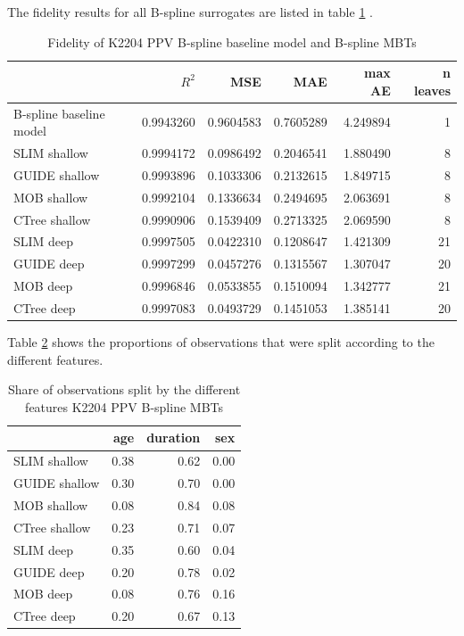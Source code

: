 The fidelity results for all B-spline surrogates are listed in table \ref{tab:ins_k2204_ppv_bsplines_surrogates_perf} .

\begin{table}

\caption{Fidelity of K2204 PPV B-spline baseline model and  B-spline MBTs}
\centering \scriptsize
\begin{tabular}[t]{l|r|r|r|r|r}
\hline
  & $R^2$ & MSE & MAE & max AE & n leaves\\
\hline
B-spline baseline model & 0.9943260 & 0.9604583 & 0.7605289 & 4.249894 & 1\\
\hline
SLIM shallow & 0.9994172 & 0.0986492 & 0.2046541 & 1.880490 & 8\\
GUIDE shallow & 0.9993896 & 0.1033306 & 0.2132615 & 1.849715 & 8\\
MOB shallow & 0.9992104 & 0.1336634 & 0.2494695 & 2.063691 & 8\\
CTree shallow & 0.9990906 & 0.1539409 & 0.2713325 & 2.069590 & 8\\
\hline
SLIM deep & 0.9997505 & 0.0422310 & 0.1208647 & 1.421309 & 21\\
GUIDE deep & 0.9997299 & 0.0457276 & 0.1315567 & 1.307047 & 20\\
MOB deep & 0.9996846 & 0.0533855 & 0.1510094 & 1.342777 & 21\\
CTree deep & 0.9997083 & 0.0493729 & 0.1451053 & 1.385141 & 20\\
\hline
\end{tabular}
\label{tab:ins_k2204_ppv_bsplines_surrogates_perf}
\end{table}





Table \ref{tab:ins_k2204_ppv_bsplines_surrogates_share}  shows the proportions of observations that were split according to the different features. 


\begin{table}[!htb]
\caption{Share of observations split by the different features K2204 PPV B-spline MBTs}
\centering \scriptsize
\begin{tabular}[t]{l|r|r|r}
\hline
  & age & duration & sex\\
\hline
SLIM shallow & 0.38 & 0.62 & 0.00\\
GUIDE shallow & 0.30 & 0.70 & 0.00\\
MOB shallow & 0.08 & 0.84 & 0.08\\
CTree shallow & 0.23 & 0.71 & 0.07\\
\hline
SLIM deep & 0.35 & 0.60 & 0.04\\
GUIDE deep & 0.20 & 0.78 & 0.02\\
MOB deep & 0.08 & 0.76 & 0.16\\
CTree deep & 0.20 & 0.67 & 0.13\\
\hline
\end{tabular}
\label{tab:ins_k2204_ppv_bsplines_surrogates_share}
\end{table}



